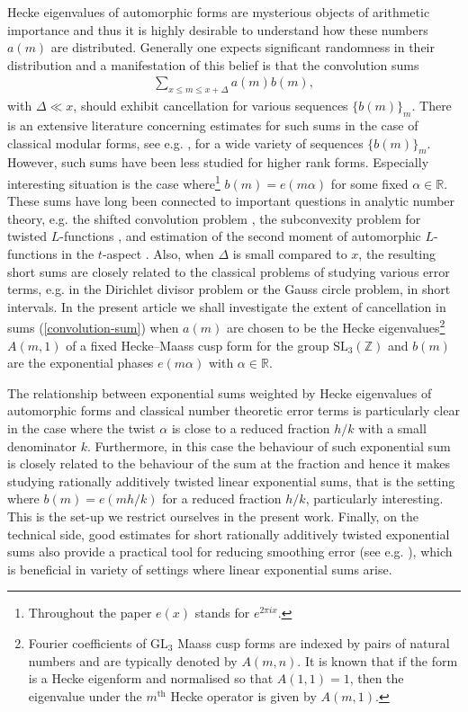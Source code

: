 \documentclass[a4paper,10pt,twoside]{amsart}
\theoremstyle{definition}
\numberwithin{equation}{section}
\renewcommand\:{\colon}
\begin{document}
\noindent Hecke eigenvalues of automorphic forms are mysterious objects of arithmetic importance and thus it is highly desirable to understand how these numbers $a(m)$ are distributed. Generally one expects significant randomness in their distribution and a manifestation of this belief is that the convolution sums  
\begin{align}\label{convolution-sum}
\sum_{x\leq m\leq x+\Delta}a(m)b(m),
\end{align}
with $\Delta\ll x$, should exhibit cancellation for various sequences $\{b(m)\}_m$. There is an extensive literature concerning estimates for such sums in the case of classical modular forms, see e.g. \cite{Jutila1985, Jutila1987, Harcos, Ernvall--Hytonen-Karppinen, Fouvry-Ganguly2014, CPZ2020, He-Wang2023}, for a wide variety of sequences $\{b(m)\}_m$. However, such sums have been less studied for higher rank forms. Especially interesting situation is the case where\footnote{Throughout the paper $e(x)$ stands for $e^{2\pi ix}$.} $b(m)=e(m\alpha)$ for some fixed $\alpha\in\mathbb R$. These sums have long been connected to important questions in analytic number theory, e.g. the shifted convolution problem \cite{Harcos, Jutila1996, Munshi2013}, the subconvexity problem for twisted $L$-functions \cite{Blomer, Munshi2014}, and estimation of the second moment of automorphic $L$-functions in the $t$-aspect \cite{Miller}. Also, when $\Delta$ is small compared to $x$, the resulting short sums are closely related to the classical problems of studying various error terms, e.g. in the Dirichlet divisor problem or the Gauss circle problem, in short intervals. In the present article we shall investigate the extent of cancellation in sums (\ref{convolution-sum}) when $a(m)$ are chosen to be the Hecke eigenvalues\footnote{Fourier coefficients of $\mathrm{GL}_3$ Maass cusp forms are indexed by pairs of natural numbers and are typically denoted by $A(m,n)$. It is known that if the form is a Hecke eigenform and normalised so that $A(1,1)=1$, then the eigenvalue under the $m^{\text{th}}$ Hecke operator is given by $A(m,1)$.} $A(m,1)$ of a fixed Hecke--Maass cusp form for the group $\mathrm{SL}_3(\mathbb Z)$ and $b(m)$ are the exponential phases $e(m\alpha)$ with $\alpha\in\mathbb R$.

The relationship between exponential sums weighted by Hecke eigenvalues of automorphic forms and classical number theoretic error terms is particularly clear in the case where the twist $\alpha$ is close to a reduced fraction $h/k$ with a small denominator $k$. Furthermore, in this case the behaviour of such exponential sum is closely related to the behaviour of the sum at the fraction and hence it makes studying rationally additively twisted linear exponential sums, that is the setting where $b(m)=e(mh/k)$ for a reduced fraction $h/k$, particularly interesting. This is the set-up we restrict ourselves in the present work. Finally, on the technical side, good estimates for short rationally additively twisted exponential sums also provide a practical tool for reducing smoothing error (see e.g. \cite{Jutila1987, Vesalainen}), which is beneficial in variety of settings where linear exponential sums arise. 
               
\end{document}
